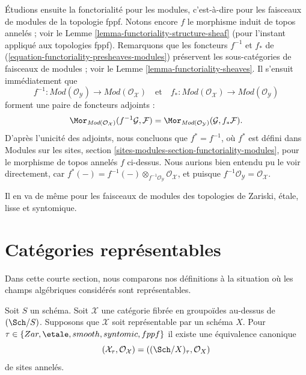 \medskip\noindent
Étudions ensuite la fonctorialité pour les modules, c'est-à-dire pour les faisceaux de modules
de la topologie fppf. Notons encore $f$ le morphisme induit de topos
annelés ; voir le
Lemme \ref{lemma-functoriality-structure-sheaf}
(pour l'instant appliqué aux topologies fppf). Remarquons que les foncteurs
$f^{-1}$ et $f_*$ de (\ref{equation-functoriality-presheaves-modules})
préservent les sous-catégories de faisceaux de modules ; voir le
Lemme \ref{lemma-functoriality-sheaves}.
Il s'ensuit immédiatement que
\begin{equation}
\label{equation-functoriality-sheaves-modules}
f^{-1} :
\textit{Mod}(\mathcal{O}_\mathcal{Y})
\longrightarrow
\textit{Mod}(\mathcal{O}_\mathcal{X})
\quad\text{et}\quad
f_* :
\textit{Mod}(\mathcal{O}_\mathcal{X})
\longrightarrow
\textit{Mod}(\mathcal{O}_\mathcal{Y})
\end{equation}
forment une paire de foncteurs adjoints :
$$
\Mor_{\textit{Mod}(\mathcal{O}_\mathcal{X})}(
f^{-1}\mathcal{G}, \mathcal{F})
=
\Mor_{\textit{Mod}(\mathcal{O}_\mathcal{Y})}(
\mathcal{G}, f_*\mathcal{F}).
$$
D'après l'unicité des adjoints, nous concluons que
$f^* = f^{-1}$, où $f^*$ est défini dans
Modules sur les sites, section \ref{sites-modules-section-functoriality-modules},
pour le morphisme de topos annelés $f$ ci-dessus. Nous aurions bien entendu pu
le voir directement, car
$f^*(-) = f^{-1}(-) \otimes_{f^{-1}\mathcal{O}_\mathcal{Y}}
\mathcal{O}_\mathcal{X}$, et puisque
$f^{-1}\mathcal{O}_\mathcal{Y} = \mathcal{O}_\mathcal{X}$.

\medskip\noindent
Il en va de même pour les faisceaux de modules des topologies de Zariski, \'etale, lisse et
syntomique.



\section{Catégories représentables}
\label{section-representable}

\noindent
Dans cette courte section, nous comparons nos définitions à la situation
où les champs algébriques considérés sont représentables.

\begin{lemma}
\label{lemma-compare-with-scheme}
Soit $S$ un schéma. Soit $\mathcal{X}$ une catégorie fibrée
en groupoïdes au-dessus de $(\Sch/S)$. Supposons que $\mathcal{X}$ soit représentable
par un schéma $X$. Pour $\tau \in \{Zar,\linebreak[0] \etale,\linebreak[0]
smooth,\linebreak[0] syntomic,\linebreak[0] fppf\}$
il existe une équivalence canonique
$$
(\mathcal{X}_\tau, \mathcal{O}_\mathcal{X}) =
((\Sch/X)_\tau, \mathcal{O}_X)
$$
de sites annelés.
\end{lemma}

